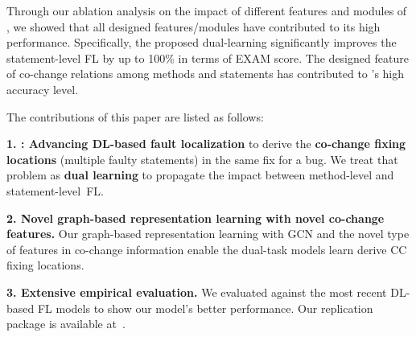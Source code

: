 Through our ablation analysis on the impact of different features and
modules of {\tool}, we showed that all designed features/modules have
contributed to its high performance. Specifically, the proposed
dual-learning significantly improves the statement-level FL by up to
100\% in terms of EXAM score. The designed feature of co-change
relations among methods and statements has contributed to {\tool}'s
high accuracy level.





The contributions of this paper are listed as follows:

{\bf 1. {\tool}: Advancing DL-based fault localization} to derive
the {\bf co-change fixing locations} (multiple faulty statements) in
  the same fix for a bug. We treat that problem as {\bf dual learning}
to propagate the impact between method-level and
statement-level~FL.


{\bf 2. Novel graph-based representation learning with novel co-change
  features.} Our graph-based representation learning with GCN and the
novel type of features in co-change information enable the dual-task
models learn derive CC fixing locations.

{\bf 3. Extensive empirical evaluation.} We evaluated {\tool} against
the most recent DL-based FL models to show our model's better
performance. Our replication package is available
at~\cite{FixLocator2022}.


